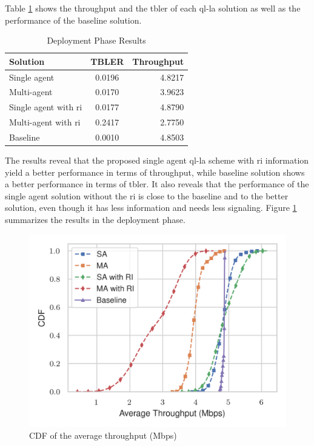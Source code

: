 Table \ref{tab:la-deploy-results} shows the throughput and the \gls{tbler} of each \gls{ql-la} solution as well as the performance of the baseline solution.
%
\begin{table}[!htb]
	\centering
	\caption{Deployment Phase Results}
	\label{tab:la-deploy-results}
	\begin{tabularx}{0.6\columnwidth}{l c r}
		\toprule
		Solution                      &   TBLER   & Throughput    \\
		\midrule
        Single agent                  &   0.0196  & 4.8217        \\
		Multi-agent                   &   0.0170  & 3.9623        \\
        Single agent with \gls{ri}    &   0.0177  & 4.8790        \\
        Multi-agent with \gls{ri}     &   0.2417  & 2.7750        \\
        Baseline                      &   0.0010  & 4.8503        \\
		\bottomrule
	\end{tabularx}
\end{table}
%
The results reveal that the proposed single agent \gls{ql-la} scheme with \gls{ri} information yield a better performance in terms of throughput, while baseline solution shows a better performance in terms of \gls{tbler}.
%
It also reveals that the performance of the single agent solution without the \gls{ri} is close to the baseline and to the better solution, even though it has less information and needs less signaling.
%
Figure \ref{fig:la-deploy-thr} summarizes the results in the deployment phase.
%
\begin{figure}[!htbp]
	\centerline{\includegraphics[width=0.8\columnwidth]{figures/chp_la/testing-sa-ma.png}}
	\caption{CDF of the average throughput (Mbps)}
	\label{fig:la-deploy-thr}
\end{figure}

